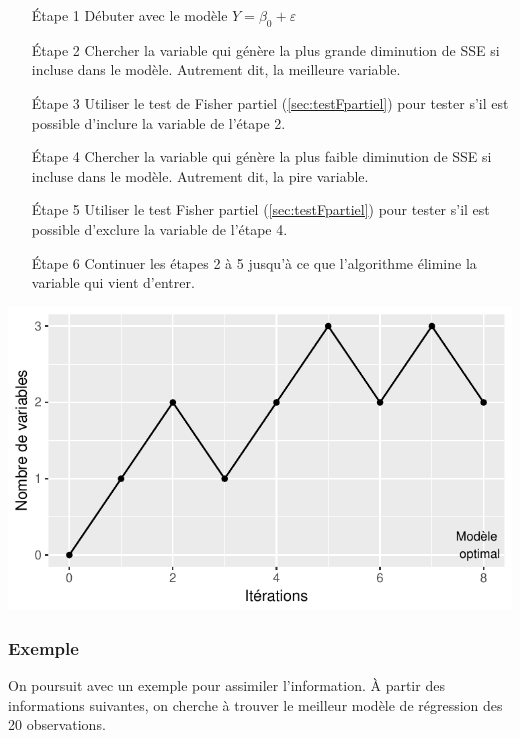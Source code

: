 \documentclass[11pt,french]{report}
\begin{document}
\begin{itemize}
\item [Étape 1] Débuter avec le modèle $Y = \beta_0 + \varepsilon$

\item [Étape 2] Chercher la variable qui génère la plus grande diminution de SSE si incluse dans le modèle. Autrement dit, la meilleure variable.

\item [Étape 3] Utiliser le test de Fisher partiel (\ref{sec:testFpartiel}) pour tester s'il est possible d'inclure la variable de l'étape 2.

\item [Étape 4] Chercher la variable qui génère la plus faible diminution de SSE si incluse dans le modèle. Autrement dit, la pire variable.

\item [Étape 5] Utiliser le test Fisher partiel (\ref{sec:testFpartiel}) pour tester s'il est possible d'exclure la variable de l'étape 4.

\item [Étape 6] Continuer les étapes 2 à 5 jusqu'à ce que l'algorithme élimine la variable qui vient d'entrer.
\end{itemize}
\bigskip

\includegraphics{notes_de_cours-028}

\bigskip
\subsubsection*{Exemple}
On poursuit avec un exemple pour assimiler l'information. \newline
À partir des informations suivantes, on cherche à trouver le meilleur modèle de régression des 20 observations.
\bigskip
\end{document}
